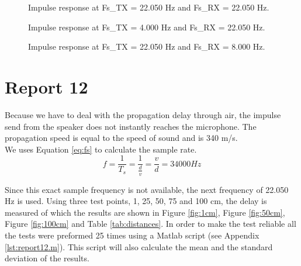 \documentclass[final]{scrreprt} %
\begin{document}
\begin{figure}[H]
	\centering
	\setlength\figureheight{4cm}
    	\setlength{}
	
	\caption{Impulse response at Fs\_TX = 22.050 Hz and Fs\_RX = 22.050 Hz.}
	\label{fig:response_1}
\end{figure}

\begin{figure}[H]
	\centering
	\setlength\figureheight{4cm}
    	\setlength{}
	
	\caption{Impulse response at Fs\_TX = 4.000 Hz and Fs\_RX = 22.050 Hz.}
	\label{fig:response_2}
\end{figure}

\begin{figure}[H]
	\centering
	\setlength\figureheight{4cm}
    	\setlength{}
	
	\caption{Impulse response at Fs\_TX = 22.050 Hz and Fs\_RX = 8.000 Hz.}
	\label{fig:response_3}
\end{figure}

%	

\section{Report 12}
Because we have to deal with the propagation delay through air, the impulse send from the speaker does not instantly reaches the microphone. 
The propagation speed is equal to the speed of sound and is 340 m/s.\\
We uses Equation \ref{eq:fs} to calculate the sample rate. 
\begin{equation}
f= \frac{1}{T_{s}}=\frac{1}{\frac{d}{v}}=\frac{v}{d}=34000 Hz
\label{eq:fs}
\end{equation}

Since this exact sample frequency is not available, the next frequency of 22.050 Hz is used.
Using three test points, 1, 25, 50, 75 and 100 cm, the delay is measured of which the results are shown in Figure \ref{fig:1cm}, Figure \ref{fig:50cm}, Figure \ref{fig:100cm} and Table \ref{tab:distances}.
In order to make the test reliable all the tests were preformed 25 times using a Matlab script (see Appendix \ref{lst:report12.m}).
This script will also calculate the mean and the standard deviation of the results.
\end{document}
